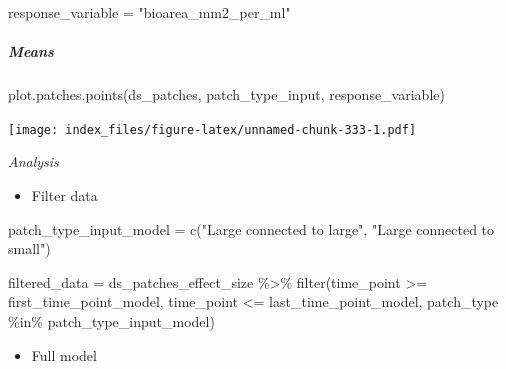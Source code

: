 \documentclass[
]{article}
\newenvironment{Shaded}{\begin{snugshade}}{\end{snugshade}}
\newcommand{\FunctionTok}[1]{\textcolor[rgb]{0.00,0.00,0.00}{#1}}
\newcommand{\NormalTok}[1]{#1}
\newcommand{\OtherTok}[1]{\textcolor[rgb]{0.56,0.35,0.01}{#1}}
\newcommand{\SpecialCharTok}[1]{\textcolor[rgb]{0.00,0.00,0.00}{#1}}
\newcommand{\StringTok}[1]{\textcolor[rgb]{0.31,0.60,0.02}{#1}}
\providecommand{\tightlist}{%
  \setlength{\itemsep}{0pt}\setlength{\parskip}{0pt}}
\begin{document}
\begin{Shaded}
\begin{Highlighting}[]
\NormalTok{response\_variable }\OtherTok{=} \StringTok{"bioarea\_mm2\_per\_ml"}
\end{Highlighting}
\end{Shaded}

\hypertarget{means-27}{%
\subparagraph{Means}\label{means-27}}

\begin{Shaded}
\begin{Highlighting}[]
\FunctionTok{plot.patches.points}\NormalTok{(ds\_patches, }
\NormalTok{                    patch\_type\_input,}
\NormalTok{                    response\_variable)}
\end{Highlighting}
\end{Shaded}

\texttt{[image: index\_files/figure-latex/unnamed-chunk-333-1.pdf]}

\emph{Analysis}

\begin{itemize}
\tightlist
\item
  Filter data
\end{itemize}

\begin{Shaded}
\begin{Highlighting}[]
\NormalTok{patch\_type\_input\_model }\OtherTok{=} \FunctionTok{c}\NormalTok{(}\StringTok{"Large connected to large"}\NormalTok{,}
                                 \StringTok{"Large connected to small"}\NormalTok{)}

\NormalTok{filtered\_data }\OtherTok{=}\NormalTok{ ds\_patches\_effect\_size }\SpecialCharTok{\%\textgreater{}\%}
                         \FunctionTok{filter}\NormalTok{(time\_point }\SpecialCharTok{\textgreater{}=}\NormalTok{ first\_time\_point\_model,}
\NormalTok{                                time\_point }\SpecialCharTok{\textless{}=}\NormalTok{ last\_time\_point\_model,}
\NormalTok{                                patch\_type }\SpecialCharTok{\%in\%}\NormalTok{ patch\_type\_input\_model)}
\end{Highlighting}
\end{Shaded}

\begin{itemize}
\tightlist
\item
  Full model
\end{itemize}
\end{document}
